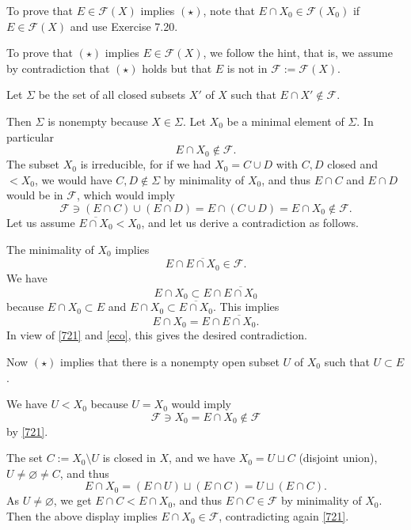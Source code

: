 \documentclass[parskip=half,fontsize=12pt]{scrartcl}%
\begin{document}
To prove that $E\in\mathcal F(X)$ implies $(\star)$, %
note that $E\cap X_0\in\mathcal F(X_0)$ if $E\in\mathcal F(X)$ and use Exercise 7.20.


To prove that $(\star)$ implies $E\in\mathcal F(X)$, %
we follow the hint, that is, we assume by contradiction that $(\star)$ holds but that $E$ is not in $\mathcal F:=\mathcal F(X)$.

Let $\Sigma$ be the set of all closed subsets $X'$ of $X$ such that $E\cap X'\notin\mathcal F$. 

Then $\Sigma$ is nonempty because %
$X\in\Sigma$. Let $X_0$ be a minimal element of $\Sigma$. In particular 
%
\begin{equation}\label{721}
E\cap X_0\notin\mathcal F.
\end{equation}
%  
The subset $X_0$ is irreducible, for if we had $X_0=C\cup D$ with $C,D$ closed and $<X_0$, we would have $C,D\notin\Sigma$ by minimality of $X_0$, and thus $E\cap C$ and $E\cap D$ would be in $\mathcal F$, which would imply 
$$
\mathcal F\ni(E\cap C)\cup(E\cap D)=E\cap(C\cup D)=E\cap X_0\notin\mathcal F.
$$ 
Let us assume $\overline{E\cap X_0}<X_0$, and let us derive a contradiction as follows. 

The minimality of $X_0$ implies 
\begin{equation}\label{eco}%
E\cap\overline{E\cap X_0}\in\mathcal F.
\end{equation}
We have 
$$
E\cap X_0\subset E\cap\overline{E\cap X_0}
$$ 
because $E\cap X_0\subset E$ and $E\cap X_0\subset\overline{E\cap X_0}$. This implies 
$$
E\cap X_0=E\cap\overline{E\cap X_0}.
$$ 
In view of \eqref{721} and \eqref{eco}, this gives the desired contradiction.

Now $(\star)$ implies that there is a nonempty open subset $U$ of $X_0$ such that $U\subset E$. 

We have $U<X_0$ because $U=X_0$ would imply 
$$
\mathcal F\ni X_0=E\cap X_0\notin\mathcal F
$$ 
by \eqref{721}. 

The set $C:=X_0\setminus U$ is closed in $X$, and we have $X_0=U\sqcup C$ (disjoint union), $U\ne\varnothing\ne C$, and thus
$$
E\cap X_0=(E\cap U)\sqcup(E\cap C)=U\sqcup(E\cap C).
$$ 
As $U\ne\varnothing$, we get $E\cap C<E\cap X_0$, and thus $E\cap C\in\mathcal F$ by minimality of $X_0$. Then the above display implies $E\cap X_0\in\mathcal F$, contradicting again \eqref{721}.
\end{document}
